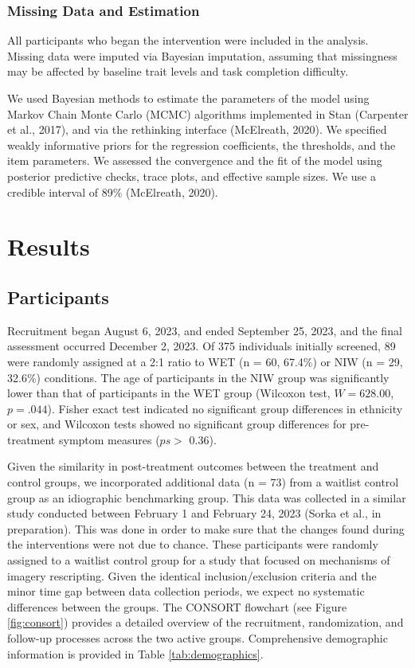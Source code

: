 \documentclass[
  man,floatsintext]{apa7}
\begin{document}
\subsubsection{Missing Data and Estimation}\label{missing-data-and-estimation}

All participants who began the intervention were included in the analysis.
Missing data were imputed via Bayesian imputation, assuming that missingness may be affected by baseline trait levels and task completion difficulty.

We used Bayesian methods to estimate the parameters of the model using Markov Chain Monte Carlo (MCMC) algorithms implemented in Stan (Carpenter et al., 2017), and via the rethinking interface (McElreath, 2020).
We specified weakly informative priors for the regression coefficients, the thresholds, and the item parameters.
We assessed the convergence and the fit of the model using posterior predictive checks, trace plots, and effective sample sizes.
We use a credible interval of 89\% (McElreath, 2020).

\section{Results}\label{results}

\subsection{Participants}\label{participants-1}

Recruitment began August 6, 2023, and ended September 25, 2023, and the final assessment occurred December 2, 2023.
Of 375 individuals initially screened,
89 were randomly assigned at a 2:1 ratio to WET (n = 60, 67.4\%) or NIW (n = 29, 32.6\%) conditions.
The age of participants in the NIW group was significantly lower than that of participants in the WET group (Wilcoxon test, \(W = 628.00\), \(p = .044\)).
Fisher exact test indicated no significant group differences in ethnicity or sex, and Wilcoxon tests showed no significant group differences for pre-treatment symptom measures (\(ps >\) 0.36).

Given the similarity in post-treatment outcomes between the treatment and control groups, we incorporated additional data (n = 73) from a waitlist control group as an idiographic benchmarking group.
This data was collected in a similar study conducted between February 1 and February 24, 2023 (Sorka et al., in preparation).
This was done in order to make sure that the changes found during the interventions were not due to chance.
These participants were randomly assigned to a waitlist control group for a study that focused on mechanisms of imagery rescripting.
Given the identical inclusion/exclusion criteria and the minor time gap between data collection periods, we expect no systematic differences between the groups.
The CONSORT flowchart (see Figure \ref{fig:consort}) provides a detailed overview of the recruitment, randomization, and follow-up processes across the two active groups.
Comprehensive demographic information is provided in Table \ref{tab:demographics}.
\end{document}

